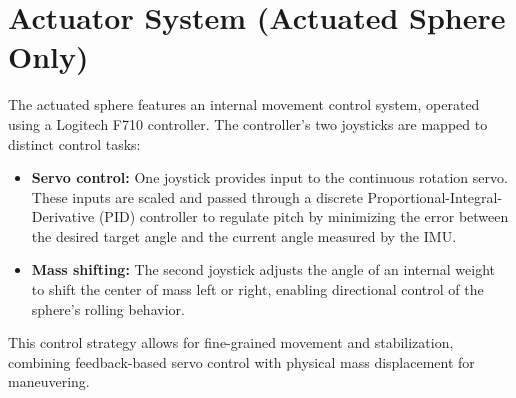 \documentclass[english, bachelor, utf8]{base/thesis_telematics}
\begin{document}
\section{Actuator System (Actuated Sphere Only)}
The actuated sphere features an internal movement control system, operated using a Logitech F710 controller. 
The controller's two joysticks are mapped to distinct control tasks:
\begin{itemize}
    \item \textbf{Servo control:} One joystick provides input to the continuous rotation servo. 
    These inputs are scaled and passed through a discrete Proportional-Integral-Derivative (PID) controller to regulate pitch by minimizing the error between the desired target angle and the current angle measured by the IMU.
    \item \textbf{Mass shifting:} The second joystick adjusts the angle of an internal weight to shift the center of mass left or right, enabling directional control of the sphere's rolling behavior.
\end{itemize}
This control strategy allows for fine-grained movement and stabilization, combining feedback-based servo control with physical mass displacement for maneuvering.
\end{document}

